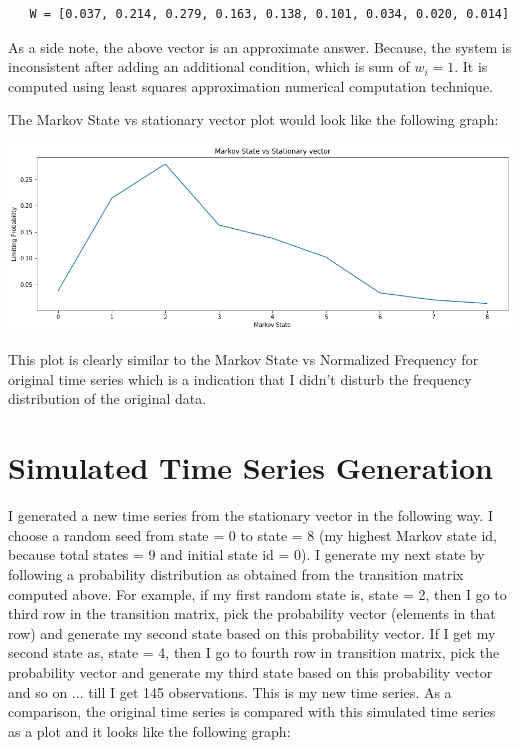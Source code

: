 \documentclass[a4paper, article, oneside, UKenglish]{memoir}
\newcommand{\0}{\mathbf{0}}
\newcommand{\1}{\mathbf{1}}
\begin{document}
\begin{verbatim}
   W = [0.037, 0.214, 0.279, 0.163, 0.138, 0.101, 0.034, 0.020, 0.014]
\end{verbatim}

As a side note, the above vector is an approximate answer. Because, the system is inconsistent after adding an additional condition, which is sum of $w_i = 1$. It is computed using least squares approximation numerical computation technique.

The Markov State vs stationary vector plot would look like the following graph:

\centerline{\includegraphics[scale=0.5]{projectfp-images/MarkovStateVsStationaryVectorPlot.png}}

This plot is clearly similar to the Markov State vs Normalized Frequency for original time series which is a indication that I didn't disturb the frequency distribution of the original data.

\section{Simulated Time Series Generation}
I generated a new time series from the stationary vector in the following way. I choose a random seed from state = 0 to state = 8 (my highest Markov state id, because total states = 9 and initial state id = 0). I generate my next state by following a probability distribution as obtained from the transition matrix computed above. For example, if my first random state is, state = 2, then I go to third row in the transition matrix, pick the probability vector (elements in that row) and generate my second state based on this probability vector. If I get my second state as, state = 4, then I go to fourth row in transition matrix, pick the probability vector and generate my third state based on this probability vector and so on ... till I get 145 observations. This is my new time series. As a comparison, the original time series is compared with this simulated time series as a plot and it looks like the following graph:
\end{document}

